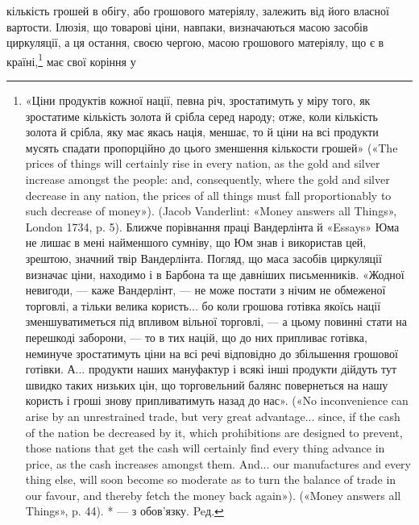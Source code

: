 кількість грошей в обігу, або грошового матеріялу, залежить від
його власної вартости. Ілюзія, що товарові ціни, навпаки, визначаються
масою засобів циркуляції, а ця остання, своєю чергою,
масою грошового матеріялу, що є в країні,\footnote{
«Ціни продуктів кожної нації, певна річ, зростатимуть у міру
того, як зростатиме кількість золота й срібла серед народу; отже, коли
кількість золота й срібла, яку має якась нація, меншає, то й ціни на всі
продукти мусять спадати пропорційно до цього зменшення кількости грошей»
(«The prices of things will certainly rise in every nation, as the gold
and silver increase amongst the people: and, consequently, where the gold
and silver decrease in any nation, the prices of all things must fall proportionably
to such decrease of money»). (Jacob Vanderlint: «Money answers
all Things», London 1734, p. 5). Ближче порівнання праці Вандерлінта
й «Essays» Юма не лишає в мені найменшого сумніву, що Юм
знав і використав цей, зрештою, значний твір Вандерлінта. Погляд, що
маса засобів циркуляції визначає ціни, находимо і в Барбона та ще давніших
письменників. «Жодної невигоди, — каже Вандерлінт, — не може
постати з нічим не обмеженої торговлі, а тільки велика користь... бо коли
грошова готівка якоїсь нації зменшуватиметься під впливом вільної
торговлі, — а цьому повинні стати на перешкоді заборони, — то в тих націй,
що до них припливає готівка, неминуче зростатимуть ціни на всі
речі відповідно до збільшення грошової готівки. А... продукти наших мануфактур
і всякі інші продукти дійдуть тут швидко таких низьких цін,
що торговельний балянс повернеться на нашу користь і гроші знову припливатимуть
назад до нас». («No inconvenience can arise by an unrestrained
trade, but very great advantage... since, if the cash of the nation be decreased
by it, which prohibitions are designed to prevent, those nations that
get the cash will certainly find every thing advance in price, as the cash
increases amongst them. And... our manufactures and every thing else, will
soon become so moderate as to turn the balance of trade in our favour, and thereby
fetch the money back again»). («Money answers all Things», p. 44).
* — з обов’язку. Peд.
} має свої коріння у

